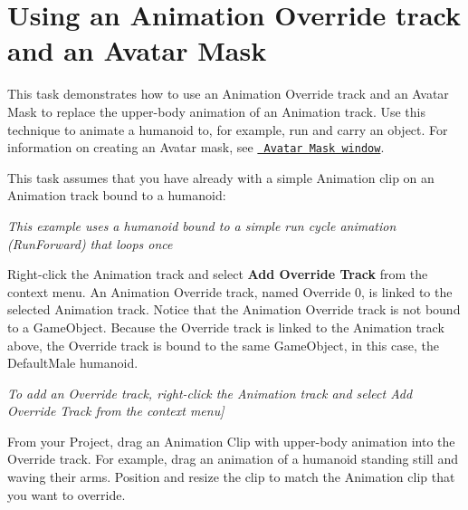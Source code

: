 \chapter{Using an Animation Override track and an Avatar Mask}
\hypertarget{md__library_2_package_cache_2com_8unity_8timeline_0d1_87_86_2_documentation_0i_2wf__mask}{}\label{md__library_2_package_cache_2com_8unity_8timeline_0d1_87_86_2_documentation_0i_2wf__mask}
\label{md__library_2_package_cache_2com_8unity_8timeline_0d1_87_86_2_documentation_0i_2wf__mask_autotoc_md1272}%
%
 This task demonstrates how to use an Animation Override track and an Avatar Mask to replace the upper-\/body animation of an Animation track. Use this technique to animate a humanoid to, for example, run and carry an object. For information on creating an Avatar mask, see \href{https://docs.unity3d.com/Manual/class-AvatarMask.html}{\texttt{ Avatar Mask window}}.

This task assumes that you have already  with a simple Animation clip on an Animation track bound to a humanoid\+:



{\itshape This example uses a humanoid bound to a simple run cycle animation (Run\+Forward) that loops once}

Right-\/click the Animation track and select {\bfseries{Add Override Track}} from the context menu. An Animation Override track, named Override 0, is linked to the selected Animation track. Notice that the Animation Override track is not bound to a Game\+Object. Because the Override track is linked to the Animation track above, the Override track is bound to the same Game\+Object, in this case, the Default\+Male humanoid.



{\itshape To add an Override track, right-\/click the Animation track and select Add Override Track from the context menu\mbox{]}}

From your Project, drag an Animation Clip with upper-\/body animation into the Override track. For example, drag an animation of a humanoid standing still and waving their arms. Position and resize the clip to match the Animation clip that you want to override.



